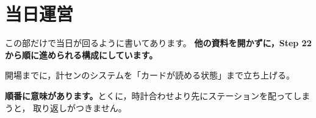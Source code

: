 \chapter{当日運営}

この部だけで当日が回るように書いてあります。
\textbf{他の資料を開かずに，Step 22 から順に進められる構成にしています。}


\begin{Goal}
開場までに，計センのシステムを「カードが読める状態」まで立ち上げる。
\end{Goal}

\textbf{順番に意味があります。}とくに，時計合わせより先にステーションを配ってしまうと，
取り返しがつきません。

